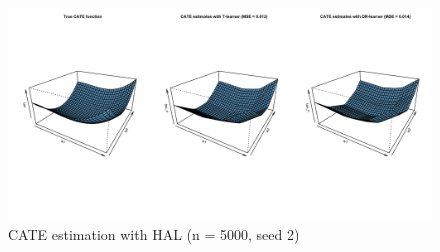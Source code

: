 \documentclass[
]{article}
\begin{document}
\begin{figure}[H]

{\centering \includegraphics[width=1\linewidth]{cate_5000_hal_2} 

}

\caption{CATE estimation with HAL (n = 5000, seed 2)}\label{fig:unnamed-chunk-28}
\end{figure}
\end{document}
